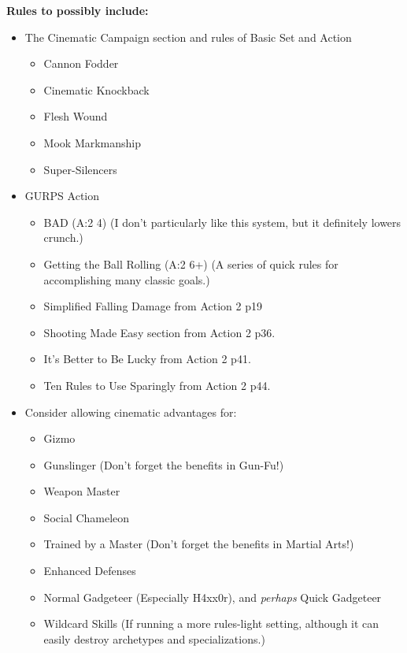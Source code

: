 \begin{multicols*}{2}
	\textbf{Rules to possibly include:}
	\begin{itemize}
		\itemsep 0pt
		\item The Cinematic Campaign section and rules of Basic Set and Action
		\begin{itemize}
			\itemsep 0pt
			\item Cannon Fodder
			\item Cinematic Knockback
			\item Flesh Wound
			\item Mook Markmanship
			\item Super-Silencers
		\end{itemize}
		\item GURPS Action
		\begin{itemize}
			\itemsep 0pt
			\item BAD (A:2 4) (I don't particularly like this system, but it definitely lowers crunch.)
			\item Getting the Ball Rolling (A:2 6+) (A series of quick rules for accomplishing many classic goals.)
			\item Simplified Falling Damage from Action 2 p19
			\item Shooting Made Easy section from Action 2 p36.
			\item It's Better to Be Lucky from Action 2 p41.
			\item Ten Rules to Use Sparingly from Action 2 p44.
		\end{itemize}
		\item Consider allowing cinematic advantages for:
		\begin{itemize}
			\itemsep 0pt
			\item Gizmo
			\item Gunslinger (Don't forget the benefits in Gun-Fu!)
			\item Weapon Master
			\item Social Chameleon	
			\item Trained by a Master (Don't forget the benefits in Martial Arts!)
			\item Enhanced Defenses
			\item Normal Gadgeteer (Especially H4xx0r), and \textit{perhaps} Quick Gadgeteer
			\item Wildcard Skills (If running a more rules-light setting, although it can easily destroy archetypes and specializations.)
		\end{itemize}
	\end{itemize}
	

\end{multicols*}
